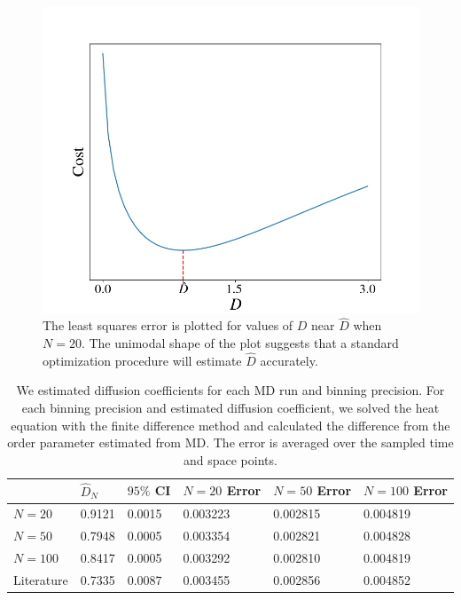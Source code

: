 \documentclass[12pt, reqno]{report}
\theoremstyle{definition}
\theoremstyle{remark}
\begin{document}
\begin{figure}[h]
    \centering
    \includegraphics[width = .5\paperwidth]{media_paper/cost.png}
    \caption{The least squares error is plotted for values of $D$ near $\hat D$ when $N=20$.
    The unimodal shape of the plot suggests that a standard optimization procedure will estimate $\hat D$ accurately.}
    \label{fg_cost}
\end{figure}

\begin{table}[h] 
    \begin{tabular}{|l|l|l|l|l|l|}
        \hline
                   & $\hat D_N$ & $95\%$ CI & $N=20$ Error & $N=50$ Error & $N=100$ Error \\ \hline
        $N=20$     & 0.9121     & 0.0015    & 0.003223     & 0.002815     & 0.004819      \\ \hline
        $N=50$     & 0.7948     & 0.0005    & 0.003354     & 0.002821     & 0.004828      \\ \hline
        $N=100$    & 0.8417     & 0.0005    & 0.003292     & 0.002810     & 0.004819      \\ \hline
        Literature & 0.7335     & 0.0087    & 0.003455     & 0.002856     & 0.004852      \\ \hline
    \end{tabular}
\caption{We estimated diffusion coefficients for each MD run and binning precision. For each binning precision and estimated diffusion coefficient, we solved the heat equation with the finite difference method and calculated the difference from the order parameter estimated from MD. The error is averaged over the sampled time and space points.}
\label{tb_diff_data}
\end{table}
\end{document}

